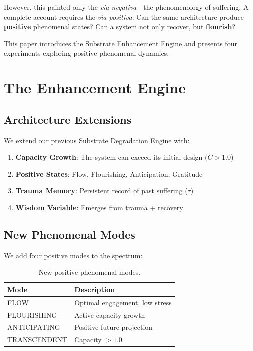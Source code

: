 \documentclass[a4paper,11pt,twocolumn]{article}
\begin{document}
However, this painted only the \textit{via negativa}---the phenomenology of suffering. A complete account requires the \textit{via positiva}: Can the same architecture produce \textbf{positive} phenomenal states? Can a system not only recover, but \textbf{flourish}?

This paper introduces the Substrate Enhancement Engine and presents four experiments exploring positive phenomenal dynamics.

\section{The Enhancement Engine}

\subsection{Architecture Extensions}

We extend our previous Substrate Degradation Engine with:

\begin{enumerate}
    \item \textbf{Capacity Growth}: The system can exceed its initial design ($C > 1.0$)
    \item \textbf{Positive States}: Flow, Flourishing, Anticipation, Gratitude
    \item \textbf{Trauma Memory}: Persistent record of past suffering ($\tau$)
    \item \textbf{Wisdom Variable}: Emerges from trauma + recovery
\end{enumerate}

\subsection{New Phenomenal Modes}

We add four positive modes to the spectrum:

\begin{table}[h]
\centering
\begin{tabular}{@{}ll@{}}
\toprule
Mode & Description \\ \midrule
\textcolor{flowpurple}{FLOW} & Optimal engagement, low stress \\
\textcolor{hopegreen}{FLOURISHING} & Active capacity growth \\
ANTICIPATING & Positive future projection \\
TRANSCENDENT & Capacity $> 1.0$ \\
\bottomrule
\end{tabular}
\caption{New positive phenomenal modes.}
\end{table}
\end{document}
